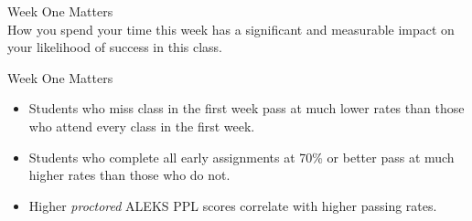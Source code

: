 \documentclass{beamer}
\begin{document}
\begin{frame}
Week One Matters\\
\vfill
How you spend your time this week has a significant and measurable impact on your likelihood of success in this class.
\vfill
\end{frame}

\begin{frame}
Week One Matters\\
\vfill
\begin{itemize}
\item Students who miss class in the first week pass at much lower rates than those who attend every class in the first week.
\item Students who complete all early assignments at 70\% or better pass at much higher rates than those who do not.
\item Higher \textit{proctored} ALEKS PPL scores correlate with higher passing rates.
\end{itemize}
\vfill
\end{frame}
\end{document}
